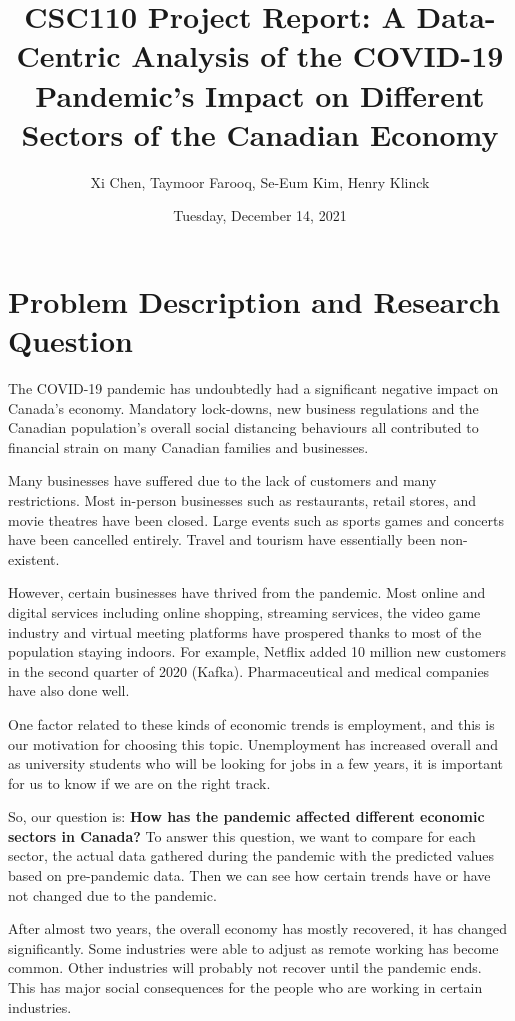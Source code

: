 \documentclass[fontsize=11pt]{article}
\title{CSC110 Project Report: A Data-Centric Analysis of the COVID-19 Pandemic's Impact on Different Sectors of the Canadian Economy}
\author{Xi Chen, Taymoor Farooq, Se-Eum Kim, Henry Klinck}
\date{Tuesday, December 14, 2021}
\begin{document}
\maketitle

\section*{Problem Description and Research Question}

The COVID-19 pandemic has undoubtedly had a significant negative impact on Canada's economy. Mandatory lock-downs, new business regulations and the Canadian population's overall social distancing behaviours all contributed to financial strain on many Canadian families and businesses.

Many businesses have suffered due to the lack of customers and many restrictions. Most in-person businesses such as restaurants, retail stores, and movie theatres have been closed. Large events such as sports games and concerts have been cancelled entirely. Travel and tourism have essentially been non-existent.

However, certain businesses have thrived from the pandemic. Most online and digital services including online shopping, streaming services, the video game industry and virtual meeting platforms have prospered thanks to most of the population staying indoors. For example, Netflix added 10 million new customers in the second quarter of 2020 (Kafka). Pharmaceutical and medical companies have also done well.

One factor related to these kinds of economic trends is employment, and this is our motivation for choosing this topic. Unemployment has increased overall and as university students who will be looking for jobs in a few years, it is important for us to know if we are on the right track. 

So, our question is: \textbf{How has the pandemic affected different economic sectors in Canada?} To answer this question, we want to compare for each sector, the actual data gathered during the pandemic with the predicted values based on pre-pandemic data. Then we can see how certain trends have or have not changed due to the pandemic. 

After almost two years, the overall economy has mostly recovered, it has changed significantly. Some industries were able to adjust as remote working has become common. Other industries will probably not recover until the pandemic ends. This has major social consequences for the people who are working in certain industries.
\end{document}
